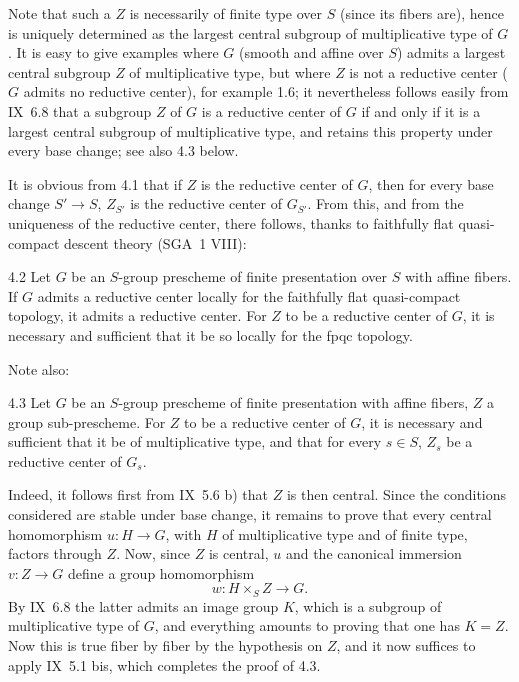 Note that such a $Z$ is necessarily of finite type over $S$ (since its fibers are), hence is uniquely determined as the largest central subgroup of multiplicative type of $G$. It is easy to give examples where $G$ (smooth and affine over $S$) admits a largest central subgroup $Z$ of multiplicative type, but where $Z$ is not a reductive center (\ie $G$ admits no reductive center), \cf for example 1.6; it nevertheless follows easily from IX~6.8 that a subgroup $Z$ of $G$ is a reductive center of $G$ if and only if it is a largest central subgroup of multiplicative type, and retains this property under every base change; see also 4.3 below.

It is obvious from 4.1 that if $Z$ is the reductive center of $G$, then for every base change $S'\to S$, $Z_{S'}$ is the reductive center of $G_{S'}$. From this, and from the uniqueness of the reductive center, there follows, thanks to faithfully flat quasi-compact descent theory (SGA~1 VIII):
\begin{proposition}{4.2}\label{XII.4.2}
Let $G$ be an $S$-group prescheme of finite presentation over $S$ with affine fibers. If $G$ admits a reductive center locally for the faithfully flat quasi-compact topology, it admits a reductive center. For $Z$ to be a reductive center of $G$, it is necessary and sufficient that it be so locally for the fpqc topology.
\end{proposition}
Note also:
\begin{proposition}{4.3}\label{XII.4.3}
Let $G$ be an $S$-group prescheme of finite presentation with affine fibers, $Z$ a group sub-prescheme. For $Z$ to be a reductive center of $G$, it is necessary and sufficient that it be of multiplicative type, and that for every $s\in S$, $Z_s$ be a reductive center of $G_s$.
\end{proposition}
Indeed, it follows first from IX~5.6 b) that $Z$ is then central. Since the conditions considered are stable under base change, it remains to prove that every central homomorphism $u:H\to G$, with $H$ of multiplicative type and of finite type, factors through $Z$. Now, since $Z$ is central, $u$ and the canonical immersion $v:Z\to G$ define a group homomorphism
\[
w:H\times_S Z\to G.
\]
By IX~6.8 the latter admits an image group $K$, which is a subgroup of multiplicative type of $G$, and everything amounts to proving that one has $K=Z$. Now this is true fiber by fiber by the hypothesis on $Z$, and it now suffices to apply IX~5.1 bis, which completes the proof of 4.3.


